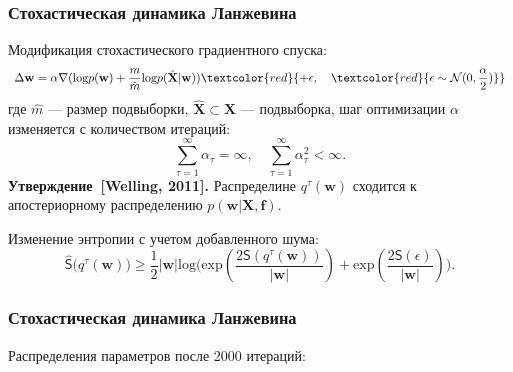 \documentclass[10pt,pdf,utf8,russian,aspectratio=169]{beamer}
\begin{document}
\begin{frame}
\frametitle{Стохастическая динамика Ланжевина}
Модификация стохастического градиентного спуска:
\[
	\Delta \mathbf{w} = \alpha \nabla (\text{log}p(\mathbf{w})+\frac{m}{\hat{m}}\text{log}p(\hat{\mathbf{X}}|\mathbf{w}))  \textcolor{red}{+ \epsilon, \quad   \textcolor{red}{\epsilon \sim  \mathcal{N}({0},{\frac{\alpha}{2}})}}
\]
где $\hat{m}$ --- размер подвыборки,  $\hat{\mathbf{X}} \subset \mathbf{X}$ --- подвыборка, шаг оптимизации $\alpha$ изменяется с количеством итераций:
\[
	\sum_{\tau=1}^\infty \alpha_\tau = \infty, \quad \sum_{\tau=1}^\infty \alpha_\tau^2 < \infty.
\]
\textbf{Утверждение~[Welling, 2011].} Распределине $q^\tau(\mathbf{w})$ сходится к апостериорному распределению $p(\mathbf{w} | \mathbf{X},\mathbf{f})$.


Изменение энтропии с учетом добавленного шума:
\[
\hat{\mathsf{S}}\bigl(q^\tau(\mathbf{w})\bigr)   \geq \frac{1}{2}|\mathbf{w}|\text{log}\bigl(\text{exp}(\frac{2\mathsf{S}(q^\tau(\mathbf{w}))}{|\mathbf{w}|}) + \text{exp}(\frac{2\mathsf{S}( \epsilon)}{|\mathbf{w}|})\bigr).
\]

\end{frame}


\begin{frame}
\frametitle{Стохастическая динамика Ланжевина}
Распределения параметров после 2000 итераций:
\begin{figure}[h]
\centering
{}
\end{figure}

\end{frame}
\end{document}

